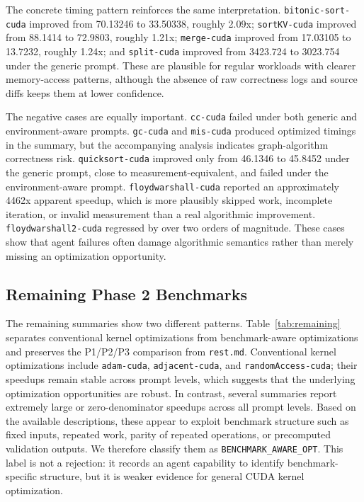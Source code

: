 \documentclass[conference]{IEEEtran}
\begin{document}
The concrete timing pattern reinforces the same interpretation. \texttt{bitonic-sort-cuda} improved from 70.13246 to 33.50338, roughly 2.09x; \texttt{sortKV-cuda} improved from 88.1414 to 72.9803, roughly 1.21x; \texttt{merge-cuda} improved from 17.03105 to 13.7232, roughly 1.24x; and \texttt{split-cuda} improved from 3423.724 to 3023.754 under the generic prompt. These are plausible for regular workloads with clearer memory-access patterns, although the absence of raw correctness logs and source diffs keeps them at lower confidence.

The negative cases are equally important. \texttt{cc-cuda} failed under both generic and environment-aware prompts. \texttt{gc-cuda} and \texttt{mis-cuda} produced optimized timings in the summary, but the accompanying analysis indicates graph-algorithm correctness risk. \texttt{quicksort-cuda} improved only from 46.1346 to 45.8452 under the generic prompt, close to measurement-equivalent, and failed under the environment-aware prompt. \texttt{floydwarshall-cuda} reported an approximately 4462x apparent speedup, which is more plausibly skipped work, incomplete iteration, or invalid measurement than a real algorithmic improvement. \texttt{floydwarshall2-cuda} regressed by over two orders of magnitude. These cases show that agent failures often damage algorithmic semantics rather than merely missing an optimization opportunity.

\subsection{Remaining Phase 2 Benchmarks}

The remaining summaries show two different patterns. Table~\ref{tab:remaining} separates conventional kernel optimizations from benchmark-aware optimizations and preserves the P1/P2/P3 comparison from \texttt{rest.md}. Conventional kernel optimizations include \texttt{adam-cuda}, \texttt{adjacent-cuda}, and \texttt{randomAccess-cuda}; their speedups remain stable across prompt levels, which suggests that the underlying optimization opportunities are robust. In contrast, several summaries report extremely large or zero-denominator speedups across all prompt levels. Based on the available descriptions, these appear to exploit benchmark structure such as fixed inputs, repeated work, parity of repeated operations, or precomputed validation outputs. We therefore classify them as \texttt{BENCHMARK\_AWARE\_OPT}. This label is not a rejection: it records an agent capability to identify benchmark-specific structure, but it is weaker evidence for general CUDA kernel optimization.
\end{document}

